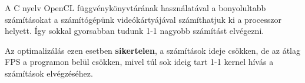 A C nyelv OpenCL függvénykönyvtárának használatával a bonyolultabb számításokat a számítógépünk videókártyájával számíthatjuk ki a processzor helyett. Így sokkal gyorsabban tudunk 1-1 nagyobb számítást elvégezni.

Az optimalizálás ezen esetben \textbf{sikertelen}, a számítások ideje csökken, de az átlag FPS a programon belül csökken, mivel túl sok ideig tart 1-1 kernel hívás a számítások elvégzéséhez.